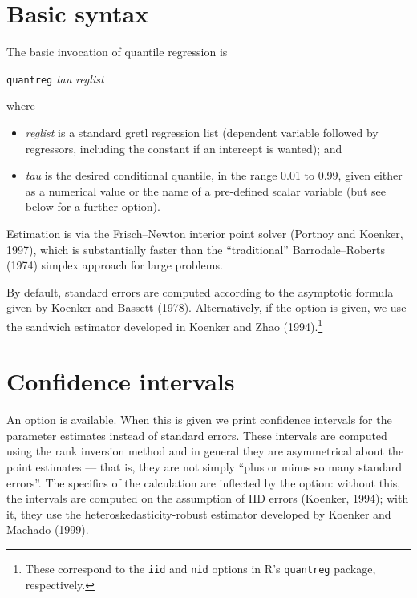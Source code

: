 \section{Basic syntax}

The basic invocation of quantile regression is

\vspace{1em}
\noindent
\qquad \texttt{quantreg} \textsl{tau} \textsl{reglist}
\vspace{1em}

where

\begin{itemize}
\item \textsl{reglist} is a standard \textsf{gretl} regression list
  (dependent variable followed by regressors, including the constant
  if an intercept is wanted); and
\item \textsl{tau} is the desired conditional quantile, in the range
  0.01 to 0.99, given either as a numerical value or the name of a
  pre-defined scalar variable (but see below for a further option).
\end{itemize}

Estimation is via the Frisch--Newton interior point solver (Portnoy
and Koenker, 1997), which is substantially faster than the
``traditional'' Barrodale--Roberts (1974) simplex approach for large
problems.

By default, standard errors are computed according to the asymptotic
formula given by Koenker and Bassett (1978).  Alternatively, if the
 option is given, we use the sandwich estimator
developed in Koenker and Zhao (1994).\footnote{These correspond to the
  \texttt{iid} and \texttt{nid} options in \textsf{R}'s
  \texttt{quantreg} package, respectively.}

\section{Confidence intervals}

An option  is available.  When this is given we
print confidence intervals for the parameter estimates instead of
standard errors.  These intervals are computed using the rank
inversion method and in general they are asymmetrical about the point
estimates --- that is, they are not simply ``plus or minus so many
standard errors''.  The specifics of the calculation are inflected by
the  option: without this, the intervals are computed
on the assumption of IID errors (Koenker, 1994); with it, they use the
heteroskedasticity-robust estimator developed by Koenker and Machado
(1999).


